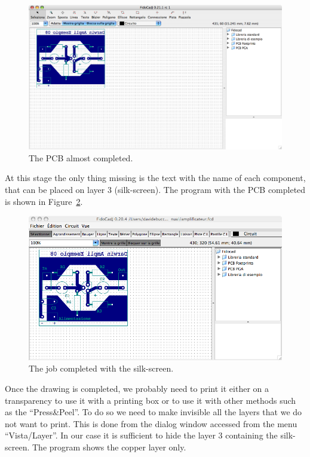 \documentclass[10pt,a4paper,twoside]{scrreprt}
\begin{document}
%
\begin{figure}
\includegraphics[width=1\textwidth]{amplificateur_phase4}

\caption{The PCB almost completed.}


\label{fig_amplificateur_phase4}
\end{figure}


At this stage the only thing missing is the text with the name of
each component, that can be placed on layer 3 (silk-screen). The program
with the PCB completed is shown in Figure~\ref{fig_amplificateur_complet}.

%
\begin{figure}
\includegraphics[width=1\textwidth]{amplificateur_complet}

\caption{The job completed with the silk-screen.}


\label{fig_amplificateur_complet}
\end{figure}


Once the drawing is completed, we probably need to print
it either on a transparency to use it with a printing box
or to use it with other methods such as the ``Press\&Peel''.
To do so we need to make invisible all the layers that we do not want
to print. This is done from the dialog window accessed from the menu
``Vista/Layer''. In our case it is sufficient to hide the
layer 3 containing the silk-screen. The program shows the copper
layer only.
\end{document}
